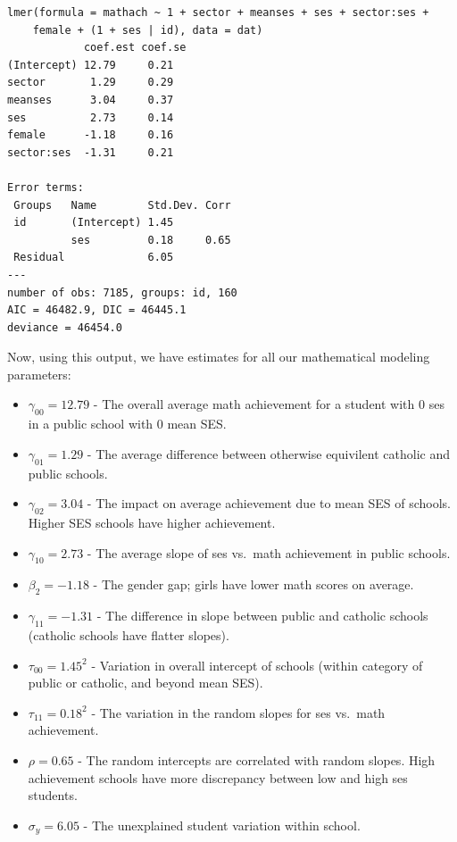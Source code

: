 \documentclass[
  letterpaper,
  DIV=11,
  numbers=noendperiod]{scrreprt}
\providecommand{\tightlist}{%
  \setlength{\itemsep}{0pt}\setlength{\parskip}{0pt}}\usepackage{longtable,booktabs,array}
\begin{document}
\begin{verbatim}
lmer(formula = mathach ~ 1 + sector + meanses + ses + sector:ses + 
    female + (1 + ses | id), data = dat)
            coef.est coef.se
(Intercept) 12.79     0.21  
sector       1.29     0.29  
meanses      3.04     0.37  
ses          2.73     0.14  
female      -1.18     0.16  
sector:ses  -1.31     0.21  

Error terms:
 Groups   Name        Std.Dev. Corr 
 id       (Intercept) 1.45          
          ses         0.18     0.65 
 Residual             6.05          
---
number of obs: 7185, groups: id, 160
AIC = 46482.9, DIC = 46445.1
deviance = 46454.0 
\end{verbatim}

Now, using this output, we have estimates for all our mathematical
modeling parameters:

\begin{itemize}
\tightlist
\item
  \(\gamma_{00} = 12.79\) - The overall average math achievement for a
  student with 0 ses in a public school with 0 mean SES.
\item
  \(\gamma_{01} = 1.29\) - The average difference between otherwise
  equivilent catholic and public schools.
\item
  \(\gamma_{02} = 3.04\) - The impact on average achievement due to mean
  SES of schools. Higher SES schools have higher achievement.
\item
  \(\gamma_{10} = 2.73\) - The average slope of ses vs.~math achievement
  in public schools.
\item
  \(\beta_2 = -1.18\) - The gender gap; girls have lower math scores on
  average.
\item
  \(\gamma_{11} = -1.31\) - The difference in slope between public and
  catholic schools (catholic schools have flatter slopes).
\item
  \(\tau_{00} = 1.45^2\) - Variation in overall intercept of schools
  (within category of public or catholic, and beyond mean SES).
\item
  \(\tau_{11} = 0.18^2\) - The variation in the random slopes for ses
  vs.~math achievement.
\item
  \(\rho = 0.65\) - The random intercepts are correlated with random
  slopes. High achievement schools have more discrepancy between low and
  high ses students.
\item
  \(\sigma_y = 6.05\) - The unexplained student variation within school.
\end{itemize}
\end{document}
